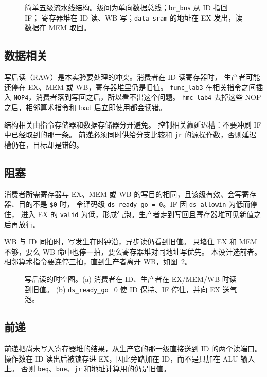 \documentclass{article}
\begin{document}
\begin{figure}[H]
  \centering
  \resizebox{\linewidth}{!}{}
  \caption{简单五级流水线结构。级间为单向数据总线；\texttt{br\_bus} 从 ID 指回 IF；
  寄存器堆在 ID 读、WB 写；\texttt{data\_sram} 的地址在 EX 发出，读数据在 MEM 取回。}
  \label{fig:pipeline}
\end{figure}

\subsection{数据相关}
写后读（RAW）是本实验要处理的冲突。消费者在 ID 读寄存器时，
生产者可能还停在 EX、MEM 或 WB，寄存器堆里仍是旧值。
\texttt{func\_lab3} 在相关指令之间插入 \texttt{NOP4}，消费者落到写回之后，所以看不出这个问题。
\texttt{hmc\_lab4} 去掉这些 NOP 之后，相邻算术指令和 load 后立即使用都会读错。

结构相关由指令存储器和数据存储器分开避免。
控制相关靠延迟槽：不要冲刷 IF 中已经取到的那一条。
前递必须同时供给分支比较和 \texttt{jr} 的源操作数，否则延迟槽仍在，目标却是错的。

\subsection{阻塞}
消费者所需寄存器与 EX、MEM 或 WB 的写目的相同，且该级有效、会写寄存器、目的不是 \texttt{\$0} 时，
令译码级 \texttt{ds\_ready\_go = 0}。IF 因 \texttt{ds\_allowin} 为低而停住，
进入 EX 的 \texttt{valid} 为低，形成气泡。生产者走到写回且寄存器堆可见新值之后再放行。

WB 与 ID 同拍时，写发生在时钟沿，异步读仍看到旧值。
只堵住 EX 和 MEM 不够，要么 WB 命中也停一拍，要么寄存器堆对同地址写优先。
本设计选前者。相邻算术指令要连停三拍，直到生产者离开 WB，如图~\ref{fig:stall-space}。

\begin{figure}[H]
  \centering
  
  \caption{写后读的时空图。(a) 消费者在 ID、生产者在 EX/MEM/WB 时读到旧值。
  (b) \texttt{ds\_ready\_go}=0 使 ID 保持、IF 停住，并向 EX 送气泡。}
  \label{fig:stall-space}
\end{figure}

\subsection{前递}
前递把尚未写入寄存器堆的结果，从生产它的那一级直接送到 ID 的两个读端口。
操作数在 ID 读出后被锁存进 EX，因此旁路加在 ID，而不是只加在 ALU 输入上。
否则 \texttt{beq}、\texttt{bne}、\texttt{jr} 和地址计算用的仍是旧值。
\end{document}
